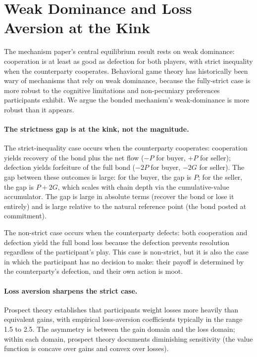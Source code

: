 \documentclass[11pt,a4paper]{article}
\theoremstyle{definition}
\theoremstyle{remark}
\newcommand{\pay}{P}
\newcommand{\cumval}{G}
\begin{document}
\section{Weak Dominance and Loss Aversion at the Kink}
\label{sec:weak-dominance}

The mechanism paper's central equilibrium result rests on weak
dominance: cooperation is at least as good as defection for both
players, with strict inequality when the counterparty cooperates.
Behavioral game theory has historically been wary of mechanisms
that rely on weak dominance, because the fully-strict case is
more robust to the cognitive limitations and non-pecuniary
preferences participants exhibit. We argue the bonded mechanism's
weak-dominance is more robust than it appears.

\paragraph{The strictness gap is at the kink, not the magnitude.}
The strict-inequality case occurs when the counterparty
cooperates: cooperation yields recovery of the bond plus the net
flow ($-\pay$ for buyer, $+\pay$ for seller); defection yields
forfeiture of the full bond ($-2\pay$ for buyer, $-2\cumval$ for
seller). The gap between these outcomes is large: for the buyer,
the gap is $\pay$; for the seller, the gap is $\pay + 2\cumval$,
which scales with chain depth via the cumulative-value
accumulator. The gap is large in absolute terms (recover the bond
or lose it entirely) and is large relative to the natural
reference point (the bond posted at commitment).

The non-strict case occurs when the counterparty defects: both
cooperation and defection yield the full bond loss because the
defection prevents resolution regardless of the participant's
play. This case is non-strict, but it is also the case in which
the participant has no decision to make: their payoff is
determined by the counterparty's defection, and their own action
is moot.

\paragraph{Loss aversion sharpens the strict case.}
Prospect theory \citep{kahneman_tversky_1979,
tversky_kahneman_1992} establishes that participants weight
losses more heavily than equivalent gains, with empirical
loss-aversion coefficients typically in the range 1.5 to 2.5.
The asymmetry is between the gain domain and the loss domain;
within each domain, prospect theory documents diminishing
sensitivity (the value function is concave over gains and convex
over losses).
\end{document}
